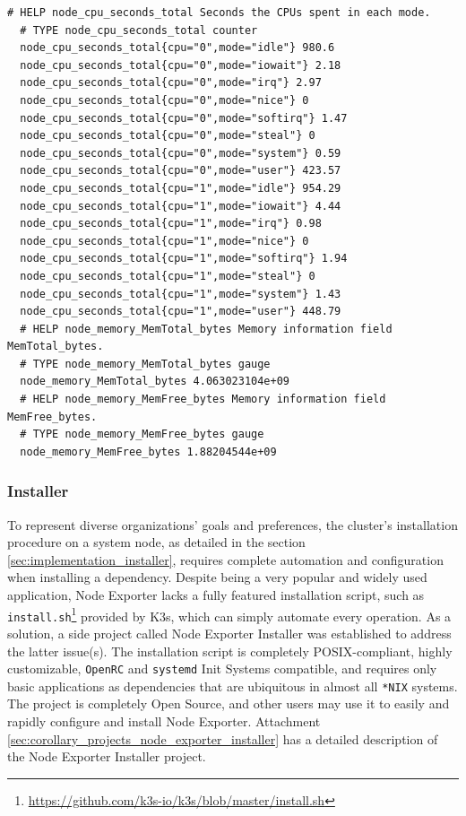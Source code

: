 \begin{lstlisting}[language=prometheus, xleftmargin=\parindent, alsoletter={_}, morekeywords={node_cpu_seconds_total, node_memory_MemTotal_bytes, node_memory_MemFree_bytes}, morekeywords={[2]{cpu, mode}}, label={lst:node_exporter}, caption=Example section of a Node Exporter response with \texttt{cpu} and \texttt{meminfo} collectors enabled]
  # HELP node_cpu_seconds_total Seconds the CPUs spent in each mode.
  # TYPE node_cpu_seconds_total counter
  node_cpu_seconds_total{cpu="0",mode="idle"} 980.6
  node_cpu_seconds_total{cpu="0",mode="iowait"} 2.18
  node_cpu_seconds_total{cpu="0",mode="irq"} 2.97
  node_cpu_seconds_total{cpu="0",mode="nice"} 0
  node_cpu_seconds_total{cpu="0",mode="softirq"} 1.47
  node_cpu_seconds_total{cpu="0",mode="steal"} 0
  node_cpu_seconds_total{cpu="0",mode="system"} 0.59
  node_cpu_seconds_total{cpu="0",mode="user"} 423.57
  node_cpu_seconds_total{cpu="1",mode="idle"} 954.29
  node_cpu_seconds_total{cpu="1",mode="iowait"} 4.44
  node_cpu_seconds_total{cpu="1",mode="irq"} 0.98
  node_cpu_seconds_total{cpu="1",mode="nice"} 0
  node_cpu_seconds_total{cpu="1",mode="softirq"} 1.94
  node_cpu_seconds_total{cpu="1",mode="steal"} 0
  node_cpu_seconds_total{cpu="1",mode="system"} 1.43
  node_cpu_seconds_total{cpu="1",mode="user"} 448.79
  # HELP node_memory_MemTotal_bytes Memory information field MemTotal_bytes.
  # TYPE node_memory_MemTotal_bytes gauge
  node_memory_MemTotal_bytes 4.063023104e+09
  # HELP node_memory_MemFree_bytes Memory information field MemFree_bytes.
  # TYPE node_memory_MemFree_bytes gauge
  node_memory_MemFree_bytes 1.88204544e+09
\end{lstlisting}

\subsubsection{Installer}
\label{subsubsec:implementation_dependencies_node_exporter_installer}

To represent diverse organizations' goals and preferences, the cluster's
installation procedure on a system node, as detailed in the section \ref{sec:implementation_installer},
requires complete automation and configuration when installing a dependency. Despite
being a very popular and widely used application, Node Exporter lacks a fully
featured installation script, such as \texttt{install.sh}\footnote{\url{https://github.com/k3s-io/k3s/blob/master/install.sh}}
provided by K3s, which can simply automate every operation. As a solution, a side
project called Node Exporter Installer was established to address the latter issue(s).
The installation script is completely POSIX-compliant, highly customizable, \texttt{OpenRC}
and \texttt{systemd} Init Systems compatible, and requires only basic
applications as dependencies that are ubiquitous in almost all \texttt{*NIX}
systems. The project is completely Open Source, and other users may use it to
easily and rapidly configure and install Node Exporter. Attachment \ref{sec:corollary_projects_node_exporter_installer}
has a detailed description of the Node Exporter Installer project.

